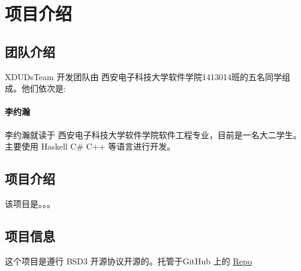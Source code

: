 
\section*{项目介绍}
\subsection*{团队介绍}
XDUDsTeam 开发团队由 西安电子科技大学软件学院1413014班的五名同学组成。他们依次是:
\paragraph{李约瀚} 李约瀚就读于 西安电子科技大学软件学院软件工程专业，目前是一名大二学生。
主要使用 Haskell C\# C++ 等语言进行开发。
\subsection*{项目介绍}
该项目是。。。
\subsection*{项目信息}
这个项目是遵行 BSD3 开源协议开源的。托管于GitHub 上的   \href{https://github.com/XDUDsTeam/}{Repo}